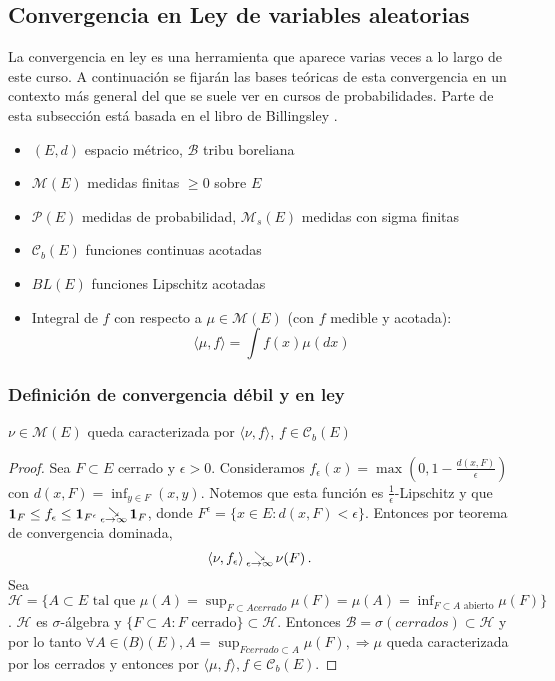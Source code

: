 \subsection{Convergencia en Ley de variables aleatorias}
La convergencia en ley es una herramienta que aparece varias veces a lo largo de este curso. A continuación se fijarán las bases teóricas de esta convergencia en un contexto más general del que se suele ver en cursos de probabilidades.
Parte de esta subsección está basada en el libro de Billingsley \cite{billing}.
\begin{notation}
\beforeitemize
\begin{itemize}
    \item $(E,d)$ espacio métrico, $\mathcal{B}$ tribu boreliana
    \item $\mathcal{M}(E)$ medidas finitas $\geq0$ sobre $E$
    \item $\mathcal{P}(E)$ medidas de probabilidad, $\mathcal{M}_s(E)$ medidas con sigma finitas %
    \item $\mathcal{C}_b(E)$ funciones continuas acotadas %
    \item $BL(E)$ funciones Lipschitz acotadas
    \item Integral de $f$ con respecto a $\mu \in \mathcal{M}(E)$ (con $f$ medible y acotada): $$ \langle \mu, f \rangle = \int f(x)\mu(dx) $$
\end{itemize}
\end{notation}


\subsubsection{Definición de convergencia débil y en ley}
\begin{remark}
$\nu \in \mathcal{M}(E)$ queda caracterizada por $\langle \nu,f \rangle$, $f \in \mathcal{C}_b(E)$
\end{remark}
\begin{proof}\gris Sea $F\subset E$ cerrado y $\epsilon>0$. Consideramos $f_\epsilon(x) = \max (0,1-\frac{d(x,F)}{\epsilon})$ con $d(x,F)=\displaystyle\inf_{y\in F}(x,y)$. Notemos que esta función es $\frac{1}{\epsilon}$-Lipschitz y que $\mathbf{1}_F\leq f_\epsilon\leq\mathbf{1}_{F^\epsilon}\,\substack{\searrow \\ \tiny{\epsilon\to\infty}}\,\mathbf{1}_F$, donde $F^\epsilon = \{x \in E : d(x,F)<\epsilon\}$. Entonces por teorema de convergencia dominada, 
$$ \langle \nu,f_\epsilon \rangle \,\substack{\searrow \\ \tiny{\epsilon\to\infty}}\, \nu(F) \, . $$
Sea $\displaystyle\mathcal{H}=\{A\subset E \mbox{ tal que }\mu(A)=\sup_{F\subset A cerrado}\mu(F)=\mu(A)=\inf_{F\subset A\mbox{ abierto}}\mu(F)\}$. $\mathcal{H}$ es $\sigma$-álgebra y $\{F\subset A : F\mbox{ cerrado}\}\subset\mathcal{H}$. Entonces $\mathcal{B}=\sigma(cerrados)\subset\mathcal{H}$ y por lo tanto $\displaystyle\forall A\in\mathcal(B)(E),A=\sup_{F cerrado \subset A}\mu(F),\Rightarrow \mu$ queda caracterizada por los cerrados y entonces por $\langle \mu,f \rangle, f\in\mathcal{C}_b(E)$. 
\negro \findem
\end{proof}

